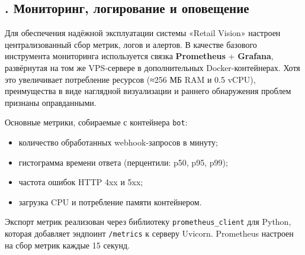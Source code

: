 {	\par
}

\subtitlespace

\subsection*{
	\gostTitleFont
	\redline
	\thechaptercntr .\thesubchaptercntr \spc
	Мониторинг, логирование и оповещение
} \addtocounter{subchaptercntr}{1}

\subtitlespace

{\gostFont

	\par \redline Для обеспечения надёжной эксплуатации системы «Retail Vision» настроен централизованный сбор метрик, логов и алертов.
	В качестве базового инструмента мониторинга используется связка \textbf{Prometheus} + \textbf{Grafana}, развёрнутая на том же VPS-сервере в дополнительных Docker-контейнерах.
	Хотя это увеличивает потребление ресурсов (≈256 МБ RAM и 0.5 vCPU), преимущества в виде наглядной визуализации и раннего обнаружения проблем признаны оправданными.
	\par \redline Основные метрики, собираемые с контейнера \texttt{bot}:
	\begin{itemize}[leftmargin=2.15cm, labelwidth=0.65cm, labelsep=0.0cm]
		\item[•] количество обработанных webhook-запросов в минуту;
		\item[•] гистограмма времени ответа (перцентили: p50, p95, p99);
		\item[•] частота ошибок HTTP 4xx и 5xx;
		\item[•] загрузка CPU и потребление памяти контейнером.
	\end{itemize}
	Экспорт метрик реализован через библиотеку \texttt{prometheus\_client} для Python, которая добавляет эндпоинт \texttt{/metrics} к серверу Uvicorn.
	Prometheus настроен на сбор метрик каждые 15 секунд.

}
